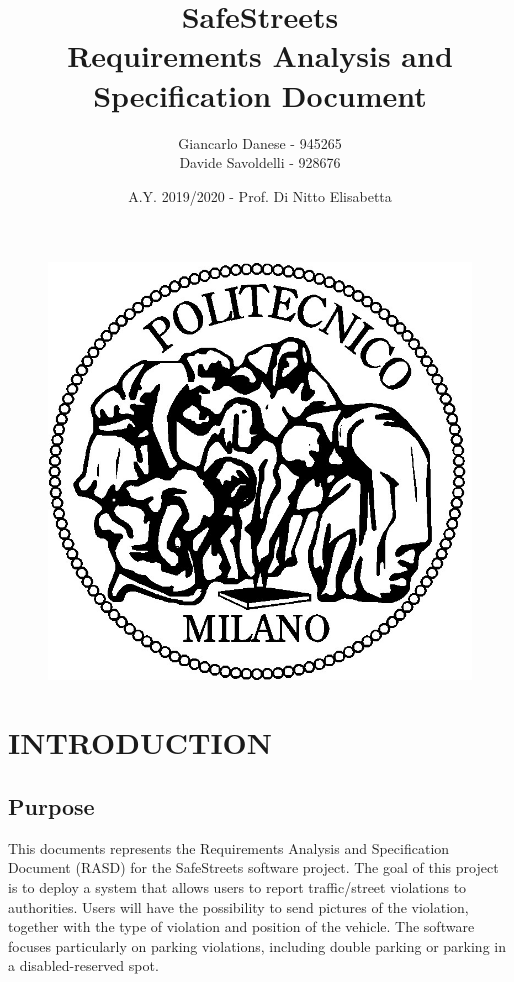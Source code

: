 \documentclass[12pt,a4paper]{article}
\author{Giancarlo Danese - 945265 \\
Davide Savoldelli - 928676}
\date{A.Y. 2019/2020 - Prof. Di Nitto Elisabetta}
\title{
 \textbf{\Huge{SafeStreets}} \\
 \large Requirements Analysis and Specification Document
}
\begin{document}
 \begin{figure}
  \centering
  \includegraphics[width=1.0\linewidth]{assets/images/logo_poli.jpg}
 \end{figure}

 \maketitle
 \newpage
 \tableofcontents
 \newpage

\section{INTRODUCTION}
\subsection{Purpose} 
This documents represents the Requirements Analysis and Specification Document (RASD) for the SafeStreets software project.
The goal of this project is to deploy a system that allows users to report traffic/street violations to authorities. \newline
Users will have the possibility to send pictures of the violation, together with the type of violation and position of the vehicle. The software focuses particularly on parking violations, including double parking or parking in a disabled-reserved spot.
\end{document}
